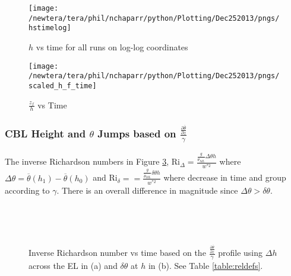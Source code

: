 \begin{figure}[htbp]
    \centering
    \texttt{[image: /newtera/tera/phil/nchaparr/python/Plotting/Dec252013/pngs/hstimelog]}
    \caption{$h$ vs time for all runs on log-log coordinates}
    \label{fig:loghvstime}   %
\end{figure}


\begin{figure}[htbp]
    \centering
    \texttt{[image: /newtera/tera/phil/nchaparr/python/Plotting/Dec252013/pngs/scaled\_h\_f\_time]}
    \caption{$\frac{z_{f}}{h}$ vs Time}
    \label{fig:zfvstime}   %
\end{figure}

\clearpage

\subsubsection{\acs{CBL} Height and $\theta$ Jumps based on $\frac{\frac{\partial \overline{\theta}}{\partial z}}{\gamma}$}

The inverse Richardson numbers in Figure \ref{fig:invristime}, \acs{Ri}$_{\Delta} =\frac{\frac{g}{\overline{\theta}_{ML}}\Delta \theta h}{w^{*2}}$ where $\Delta \theta = \overline{\theta}(h_{1}) - \overline{\theta}(h_{0})$ and \acs{Ri}$_{\delta} = =\frac{\frac{g}{\overline{\theta}_{ML}} \delta \theta h}{w^{*2}}$ where  decrease in time and group according to $\gamma$. There is an overall difference in magnitude since $\Delta \theta > \delta \theta$.\\  

\begin{figure}[htbp]

\begin{minipage}[b]{0.5\linewidth}
         
        \\
        \end{minipage}             
\quad
\begin{minipage}[b]{0.5\linewidth}
        \\
       
       \end{minipage}
        \caption[Richardson numbers based on $\frac{\frac{\partial \overline{\theta}}{\partial z}}{\gamma}$]{Inverse Richardson number vs time based on the $\frac{\frac{\partial \overline{\theta}}{\partial z}}{\gamma}$
profile using $\Delta h$ across the \acs{EL} in (a) and $\delta \theta$ at $h$ in (b).  See Table \ref{table:reldefs}.}
        \label{fig:invristime}
\end{figure}

